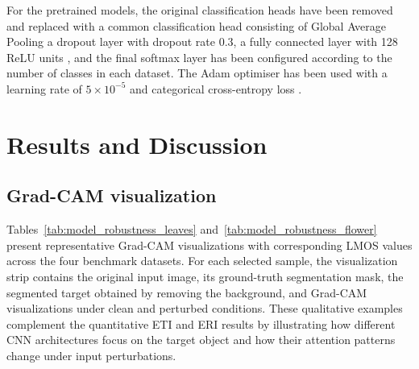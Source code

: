 \documentclass[a4paper,fleqn]{cas-dc}
\begin{document}
	For the pretrained models, the original classification heads have been removed and replaced with a common classification head consisting of Global Average Pooling \cite{ref43} %
    a dropout layer \cite{r44} with dropout rate 0.3, a fully connected layer with 128 ReLU units  \cite{r45}, and the final softmax layer has been configured according to the number of classes in each dataset.
	The Adam optimiser \cite{r46} has been used with a learning rate of $5\times10^{-5}$ and categorical cross-entropy loss \cite{ref43}. %
	
	
\section{Results and Discussion}
\label{sec:results}



    
\subsection{Grad-CAM visualization}
\label{sec:gradcam_visualization}

Tables~\ref{tab:model_robustness_leaves} and~\ref{tab:model_robustness_flower} present representative Grad-CAM visualizations with corresponding LMOS values across the four benchmark datasets. For each selected sample, the visualization strip contains the original input image, its ground-truth segmentation mask, the segmented target obtained by removing the background, and Grad-CAM visualizations under clean and perturbed conditions. These qualitative examples complement the quantitative ETI and ERI results by illustrating how different CNN architectures focus on the target object and how their attention patterns change under input perturbations.
\end{document}
